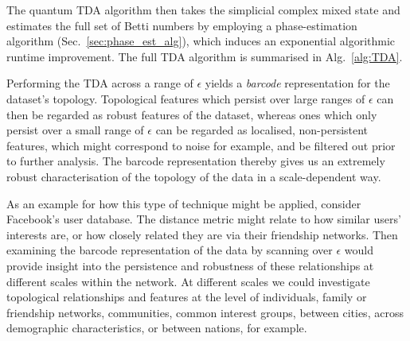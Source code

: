 The quantum TDA algorithm then takes the simplicial complex mixed state and estimates the full set of Betti numbers by employing a phase-estimation algorithm (Sec.~\ref{sec:phase_est_alg}), which induces an exponential algorithmic runtime improvement. The full TDA algorithm is summarised in Alg.~\ref{alg:TDA}.

Performing the TDA across a range of $\epsilon$ yields a \textit{barcode} representation for the dataset's topology. Topological features which persist over large ranges of $\epsilon$ can then be regarded as robust features of the dataset, whereas ones which only persist over a small range of $\epsilon$ can be regarded as localised, non-persistent features, which might correspond to noise for example, and be filtered out prior to further analysis. The barcode representation thereby gives us an extremely robust characterisation of the topology of the data in a scale-dependent way.

As an example for how this type of technique might be applied, consider Facebook's user database. The distance metric might relate to how similar users' interests are, or how closely related they are via their friendship networks. Then examining the barcode representation of the data by scanning over $\epsilon$ would provide insight into the persistence and robustness of these relationships at different scales within the network. At different scales we could investigate topological relationships and features at the level of individuals, family or friendship networks, communities, common interest groups, between cities, across demographic characteristics, or between nations, for example.

